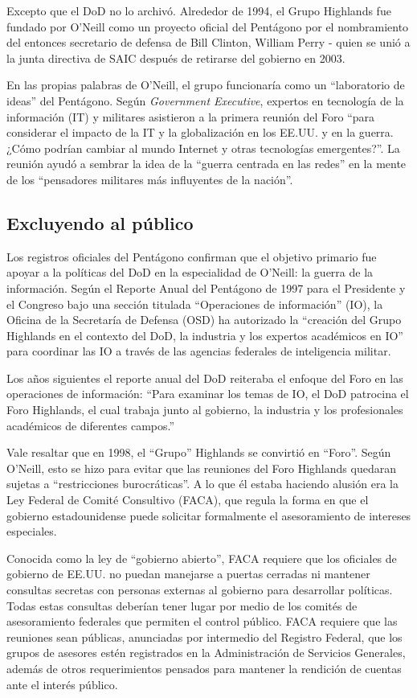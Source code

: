 \documentclass[10pt,a5paper,twoside,spanish,]{book}
\begin{document}
Excepto que el DoD no lo archivó. Alrededor de 1994, el Grupo Highlands
fue fundado por O'Neill como un proyecto oficial del Pentágono por el
nombramiento del entonces secretario de defensa de Bill Clinton, William
Perry - quien se unió a la junta directiva de SAIC después de retirarse
del gobierno en 2003.

En las propias palabras de O'Neill, el grupo funcionaría como un
``laboratorio de ideas'' del Pentágono. Según \emph{Government
Executive}, expertos en tecnología de la información (IT) y militares
asistieron a la primera reunión del Foro ``para considerar el impacto de
la IT y la globalización en los EE.UU. y en la guerra. ¿Cómo podrían
cambiar al mundo Internet y otras tecnologías emergentes?''. La reunión
ayudó a sembrar la idea de la ``guerra centrada en las redes'' en la
mente de los ``pensadores militares más influyentes de la nación''.

\subsection{Excluyendo al público}\label{excluyendo-al-puxfablico}

Los registros oficiales del Pentágono confirman que el objetivo primario
fue apoyar a la políticas del DoD en la especialidad de O'Neill: la
guerra de la información. Según el Reporte Anual del Pentágono de 1997
para el Presidente y el Congreso bajo una sección titulada ``Operaciones
de información'' (IO), la Oficina de la Secretaría de Defensa (OSD) ha
autorizado la ``creación del Grupo Highlands en el contexto del DoD, la
industria y los expertos académicos en IO'' para coordinar las IO a
través de las agencias federales de inteligencia militar.

Los años siguientes el reporte anual del DoD reiteraba el enfoque del
Foro en las operaciones de información: ``Para examinar los temas de IO,
el DoD patrocina el Foro Highlands, el cual trabaja junto al gobierno,
la industria y los profesionales académicos de diferentes campos.''

Vale resaltar que en 1998, el ``Grupo'' Highlands se convirtió en
``Foro''. Según O'Neill, esto se hizo para evitar que las reuniones del
Foro Highlands quedaran sujetas a ``restricciones burocráticas''. A lo
que él estaba haciendo alusión era la Ley Federal de Comité Consultivo
(FACA), que regula la forma en que el gobierno estadounidense puede
solicitar formalmente el asesoramiento de intereses especiales.

Conocida como la ley de ``gobierno abierto'', FACA requiere que los
oficiales de gobierno de EE.UU. no puedan manejarse a puertas cerradas
ni mantener consultas secretas con personas externas al gobierno para
desarrollar políticas. Todas estas consultas deberían tener lugar por
medio de los comités de asesoramiento federales que permiten el control
público. FACA requiere que las reuniones sean públicas, anunciadas por
intermedio del Registro Federal, que los grupos de asesores estén
registrados en la Administración de Servicios Generales, además de otros
requerimientos pensados para mantener la rendición de cuentas ante el
interés público.
\end{document}
